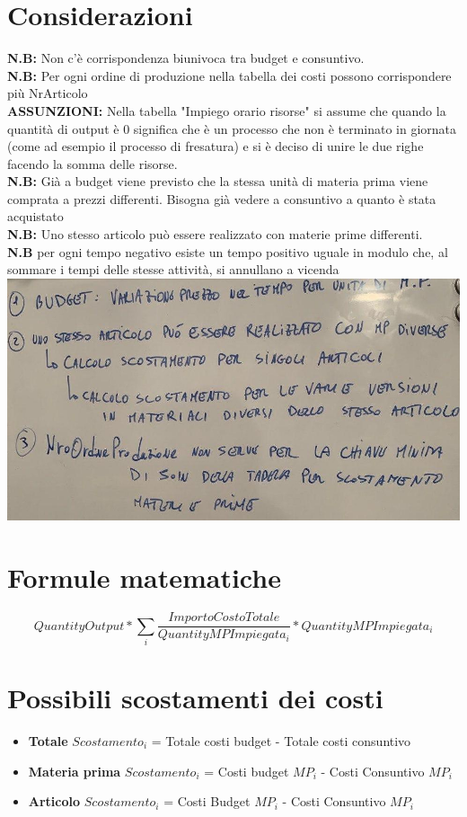 \documentclass{article}
\begin{document}
\section{Considerazioni}
\textbf{N.B:} Non c’è corrispondenza biunivoca tra budget e consuntivo.
\\\textbf{N.B:} Per ogni ordine di produzione nella tabella dei costi possono corrispondere più NrArticolo
\\\textbf{ASSUNZIONI:} Nella tabella "Impiego orario risorse" si assume che quando la quantità di output è 0 significa che è un processo che non è terminato in giornata (come ad esempio il 
processo di fresatura) e si è deciso di unire le due righe facendo la somma delle risorse.
\\\textbf{N.B:} Già a budget viene previsto che la stessa unità di materia prima viene comprata a prezzi differenti. Bisogna già vedere a consuntivo a quanto è stata acquistato
\\\textbf{N.B:} Uno stesso articolo può essere realizzato con materie prime differenti.
\\\textbf{N.B} per ogni tempo negativo esiste un tempo positivo uguale in modulo che, al sommare i tempi delle stesse attività, si annullano a vicenda
\\\includegraphics[scale = 0.4]{Lavagnetta.jpg}

\section{Formule matematiche}

$$QuantityOutput*\sum_{i}\frac{ImportoCostoTotale}{QuantityMPImpiegata_{i}}*QuantityMPImpiegata_{i}$$
\section{Possibili scostamenti dei costi}
\begin{itemize} 
    \item \textbf{Totale} \rightarrow  $Scostamento_{i}$ = Totale costi budget - Totale costi consuntivo
    \item \textbf{Materia prima} \rightarrow  $Scostamento_{i}$ = Costi budget $MP_{i}$ - Costi Consuntivo $MP_{i}$
    \item \textbf{Articolo} \rightarrow  $Scostamento_{i}$ = Costi Budget $MP_{i}$ - Costi Consuntivo $MP_{i}$
\end{itemize}
\end{document}
